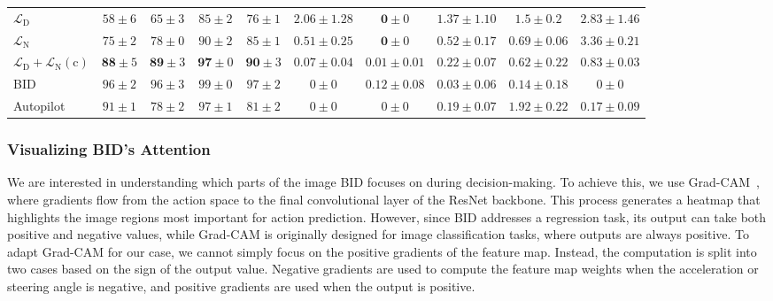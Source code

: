 \begin{table}
\begin{tabular}{lccccccccc}
		$\mathcal{L}_\text{D}$
		& $58\pm6$ & $65\pm3$ & $85\pm2$ & $76\pm1$ 
		& $2.06\pm1.28$ & $\mathbf{0}\pm0$ & $1.37\pm1.10$ & $1.5\pm0.2$ & $2.83\pm1.46$ \\
		$\mathcal{L}_\text{N}$
		& $75\pm2$ & $78\pm0$ & $90\pm2$ & $85\pm1$ 
		& $0.51\pm0.25$ & $\mathbf{0}\pm0$ & $0.52\pm0.17$ & $0.69\pm0.06$ & $3.36\pm0.21$ \\
		$\mathcal{L}_\text{D}+\mathcal{L}_\text{N}(\text{c})$
		& $\mathbf{88} \pm 5$ & $\mathbf{89} \pm 3$ & $\mathbf{97} \pm 0$ & $\mathbf{90} \pm 3$ 
		& $\mathbf{0.07} \pm 0.04$ & $0.01 \pm 0.01$ & $\mathbf{0.22} \pm 0.07$ & $\mathbf{0.62} \pm 0.22$ & $\mathbf{0.83} \pm 0.03$ \\
		\hline
		BID
		& $96 \pm 2$ & $96 \pm 3$ & $99 \pm 0$ & $97 \pm 2$ 
		& $0 \pm 0$ & $0.12 \pm 0.08$ & $0.03 \pm 0.06$ & $0.14 \pm 0.18$ & $0 \pm 0$ \\
		Autopilot
		& $91 \pm 1$ & $78 \pm 2$ & $97 \pm 1$ & $81 \pm 2$ 
		& $0 \pm 0$ & $0 \pm 0$ & $0.19 \pm 0.07$ & $1.92 \pm 0.22$ & $0.17 \pm 0.09$\\
		\hline
	\end{tabular}
	\vspace{-1ex}
	\vspace{-2.5ex}
	\label{table:infraction}
\end{table}


\subsubsection{Visualizing BID's Attention}
\label{sec:Visualization}
\hspace{1pc}We are interested in understanding which parts of the image BID focuses on during decision-making. 
To achieve this, we use Grad-CAM~\cite{Selvaraju:2017}, where gradients flow from the action space to the final convolutional layer of the ResNet backbone. 
This process generates a heatmap that highlights the image regions most important for action prediction. 
However, since BID addresses a regression task, its output can take both positive and negative values, while Grad-CAM is originally designed for image classification tasks, where outputs are always positive. 
To adapt Grad-CAM for our case, we cannot simply focus on the positive gradients of the feature map. 
Instead, the computation is split into two cases based on the sign of the output value. 
Negative gradients are used to compute the feature map weights when the acceleration or steering angle is negative, and positive gradients are used when the output is positive.


